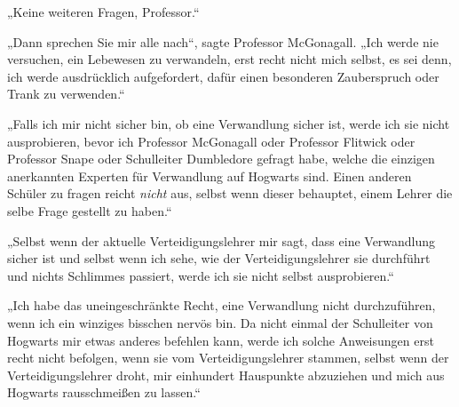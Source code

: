 „Keine weiteren Fragen, Professor.“ 

„Dann sprechen Sie mir alle nach“, sagte Professor McGonagall. „Ich werde nie versuchen, ein Lebewesen zu verwandeln, erst recht nicht mich selbst, es sei denn, ich werde ausdrücklich aufgefordert, dafür einen besonderen Zauberspruch oder Trank zu verwenden.“ 

„Falls ich mir nicht sicher bin, ob eine Verwandlung sicher ist, werde ich sie nicht ausprobieren, bevor ich Professor McGonagall oder Professor Flitwick oder Professor Snape oder Schulleiter Dumbledore gefragt habe, welche die einzigen anerkannten Experten für Verwandlung auf Hogwarts sind. Einen anderen Schüler zu fragen reicht \emph{nicht} aus, selbst wenn dieser behauptet, einem Lehrer die selbe Frage gestellt zu haben.“ 

„Selbst wenn der aktuelle Verteidigungslehrer mir sagt, dass eine Verwandlung sicher ist und selbst wenn ich sehe, wie der Verteidigungslehrer sie durchführt und nichts Schlimmes passiert, werde ich sie nicht selbst ausprobieren.“ 

„Ich habe das uneingeschränkte Recht, eine Verwandlung nicht durchzuführen, wenn ich ein winziges bisschen nervös bin. Da nicht einmal der Schulleiter von Hogwarts mir etwas anderes befehlen kann, werde ich solche Anweisungen erst recht nicht befolgen, wenn sie vom Verteidigungslehrer stammen, selbst wenn der Verteidigungslehrer droht, mir einhundert Hauspunkte abzuziehen und mich aus Hogwarts rausschmeißen zu lassen.“ 

